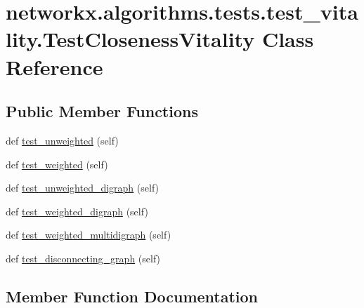 \hypertarget{classnetworkx_1_1algorithms_1_1tests_1_1test__vitality_1_1TestClosenessVitality}{}\section{networkx.\+algorithms.\+tests.\+test\+\_\+vitality.\+Test\+Closeness\+Vitality Class Reference}
\label{classnetworkx_1_1algorithms_1_1tests_1_1test__vitality_1_1TestClosenessVitality}
\subsection*{Public Member Functions}
\begin{DoxyCompactItemize}
\item 
def \hyperlink{classnetworkx_1_1algorithms_1_1tests_1_1test__vitality_1_1TestClosenessVitality_a6db2a32f0350dddec10d31481762e351}{test\+\_\+unweighted} (self)
\item 
def \hyperlink{classnetworkx_1_1algorithms_1_1tests_1_1test__vitality_1_1TestClosenessVitality_a28b4144fd0be1f712474f6dff712b83f}{test\+\_\+weighted} (self)
\item 
def \hyperlink{classnetworkx_1_1algorithms_1_1tests_1_1test__vitality_1_1TestClosenessVitality_ad9a266fd1e2f134d9840ae582dac850d}{test\+\_\+unweighted\+\_\+digraph} (self)
\item 
def \hyperlink{classnetworkx_1_1algorithms_1_1tests_1_1test__vitality_1_1TestClosenessVitality_a5d799cd329d035313bf5179aea245a2b}{test\+\_\+weighted\+\_\+digraph} (self)
\item 
def \hyperlink{classnetworkx_1_1algorithms_1_1tests_1_1test__vitality_1_1TestClosenessVitality_a73bc5688141670e4e0d69d4340e555c4}{test\+\_\+weighted\+\_\+multidigraph} (self)
\item 
def \hyperlink{classnetworkx_1_1algorithms_1_1tests_1_1test__vitality_1_1TestClosenessVitality_aa4fd3bb135d30e27861f38f831811f6d}{test\+\_\+disconnecting\+\_\+graph} (self)
\end{DoxyCompactItemize}


\subsection{Member Function Documentation}
\mbox{\label{classnetworkx_1_1algorithms_1_1tests_1_1test__vitality_1_1TestClosenessVitality_aa4fd3bb135d30e27861f38f831811f6d}} 
